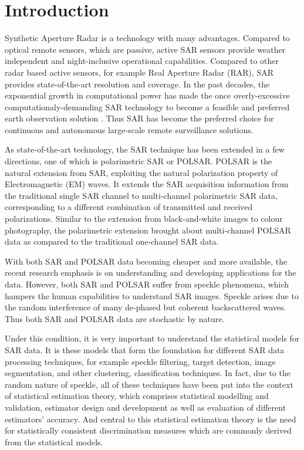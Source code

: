 \chapter{Introduction}

Synthetic Aperture Radar is a technology with many advantages. Compared to optical
remote sensors, which are passive, active SAR sensors provide weather independent and
night-inclusive operational capabilities. Compared to other radar based active sensors,
for example Real Aperture Radar (RAR), SAR provides state-of-the-art resolution
and coverage.
In the past decades, the exponential growth in computational power has made the once overly-excessive computationaly-demanding SAR technology to become a feasible and preferred earth observation solution \citep{Cumming_2005_Artech}.
Thus SAR has become the preferred choice for continuous and autonomous large-scale
remote surveillance solutions.

As state-of-the-art technology, the SAR technique has been extended in a few directions, one of which is polarimetric SAR or POLSAR. POLSAR is the natural
extension from SAR, exploiting the natural polarization property of Electromagnetic
(EM) waves. It extends the SAR acquisition information from the traditional single
SAR channel to multi-channel polarimetric SAR data, corresponding to a different combination of transmitted and received polarizations. Similar to the extension from black-and-white images to colour photography, the polarimetric extension brought about
multi-channel POLSAR data as compared to the traditional one-channel SAR data.

With both SAR and POLSAR data becoming cheaper and more available, the recent research emphasis is on understanding and developing applications for the data. However, both SAR 
and POLSAR suffer from speckle phenomena, which hampers the human capabilities
to understand SAR images. Speckle arises due to the random interference of many
de-phased but coherent backscattered waves. Thus both SAR and POLSAR data are
stochastic by nature.

Under this condition, it is very important to understand the statistical models for SAR
data. It is these models that form the foundation for different SAR data processing
techniques, for example speckle filtering, target detection, image segmentation, and
other clustering, classification techniques. In fact, due to the random nature of speckle,
all of these techniques have been put into the context of statistical estimation theory,
which comprises statistical modelling and validation, estimator design and development
as well as evaluation of different estimators’ accuracy. And central to this statistical
estimation theory is the need for statistically consistent discrimination measures which
are commonly derived from the statistical models.

